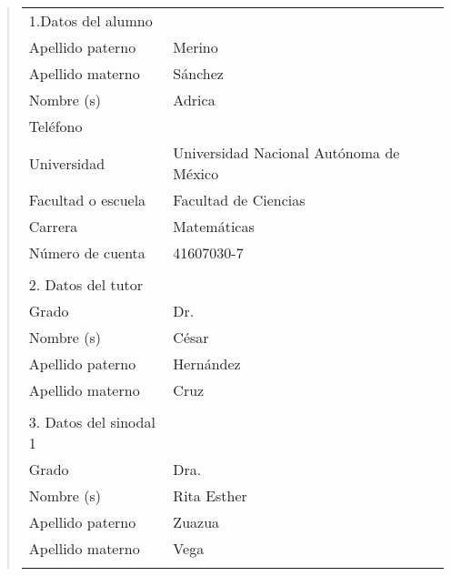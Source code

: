 {\small
\begin{quote}
\begin{tabular}{lll}
1.Datos del alumno          & {}                                          \\
Apellido paterno            & Merino                                     \\
Apellido materno            & S\'anchez                                     \\
Nombre (s)                   & Adrica                                     \\
Tel\'efono                  &                              \\
Universidad                 & Universidad Nacional Aut\'onoma de M\'exico \\
Facultad o escuela          & Facultad de Ciencias                        \\
Carrera                     & Matem\'aticas                                     \\
N\'umero de cuenta          & 41607030-7                                   \\
{}                          & {}                                          \\
2. Datos del tutor          & {}                                          \\
Grado                       & Dr.                                         \\
Nombre (s)                   & C\'esar                                     \\
Apellido paterno            & Hern\'andez                                 \\
Apellido materno            & Cruz                                        \\
{}                          & {}                                          \\
3. Datos del sinodal 1      & {}                                          \\
Grado                       & Dra.                                        \\
Nombre (s)                   & Rita Esther                                     \\
Apellido paterno            & Zuazua                                     \\
Apellido materno            & Vega                                     \\
{}                          & {}                                          \\

\end{tabular}
\end{quote}}
